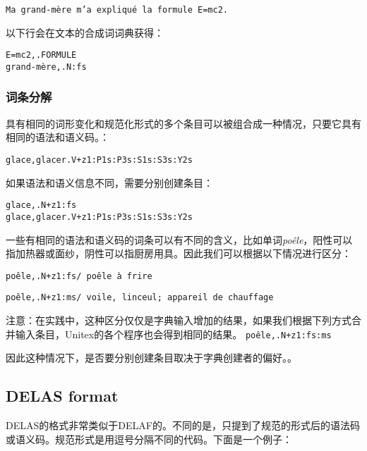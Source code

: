 \verb$Ma grand-mère m’a expliqué la formule E=mc2.$


\bigskip \noindent 以下行会在文本的合成词词典获得：


\begin{verbatim}
E=mc2,.FORMULE
grand-mère,.N:fs
\end{verbatim}


\subsubsection{词条分解}

具有相同的词形变化和规范化形式的多个条目可以被组合成一种情况，只要它具有相同的语法和语义码。：


\bigskip
\begin{verbatim}
glace,glacer.V+z1:P1s:P3s:S1s:S3s:Y2s
\end{verbatim}

\bigskip 
\noindent 如果语法和语义信息不同，需要分别创建条目：


\bigskip
\begin{verbatim}
glace,.N+z1:fs
glace,glacer.V+z1:P1s:P3s:S1s:S3s:Y2s
\end{verbatim}

\bigskip 
\noindent 

一些有相同的语法和语义码的词条可以有不同的含义，比如单词\textit{poêle}，阳性可以指加热器或面纱，阴性可以指厨房用具。因此我们可以根据以下情况进行区分：



\bigskip
\noindent
\texttt{poêle,.N+z1:fs/ poêle à frire}

\noindent
\texttt{poêle,.N+z1:ms/ voile, linceul; appareil de chauffage}

\bigskip 
\noindent 注意：在实践中，这种区分仅仅是字典输入增加的结果，如果我们根据下列方式合并输入条目，Unitex的各个程序也会得到相同的结果。
\bigskip
\noindent
\texttt{poêle,.N+z1:fs:ms}

\bigskip 
\noindent 因此这种情况下，是否要分别创建条目取决于字典创建者的偏好。。



\subsection{DELAS format}
\label{section-DELAS-format}

DELAS的格式非常类似于DELAF的。不同的是，只提到了规范的形式后的语法码或语义码。规范形式是用逗号分隔不同的代码。下面是一个例子：


